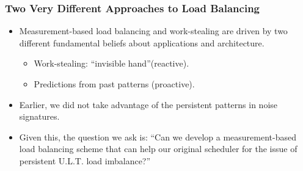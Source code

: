 \begin{frame} 
\frametitle{Two Very Different Approaches to Load Balancing} 
\begin{itemize} 
\item \small Measurement-based load balancing and work-stealing 
are driven by two different fundamental beliefs about applications and
architecture. \\  
\begin{itemize}
\item \small Work-stealing: ``invisible hand''(reactive). \\ 
\item \small Predictions from past patterns (proactive). \\
\end{itemize} 

\small \item {\small Earlier, we did not take advantage of the
  persistent patterns in noise signatures.} \\ 
\item {\small Given this, the question we ask is:
``Can we develop a measurement-based load balancing scheme that can
help our original scheduler for the issue of persistent U.L.T. load
imbalance?''} \\ 
\end{itemize} 
\end{frame}  

